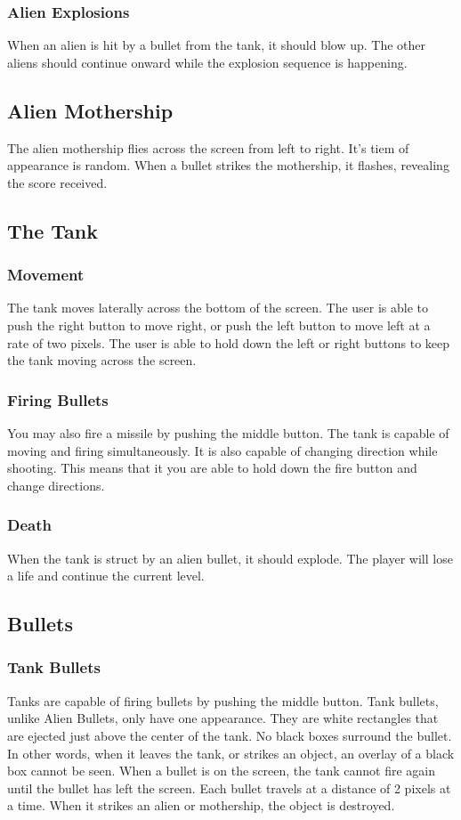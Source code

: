 \documentclass[11pt,letter,oneside]{report}
\begin{document}
\subsubsection{Alien Explosions}
When an alien is hit by a bullet from the tank, it should blow up.  The other aliens should continue onward while the explosion sequence is happening.

\subsection{Alien Mothership}
The alien mothership flies across the screen from left to right. It's tiem of appearance is random. When a bullet strikes the mothership, it flashes, revealing the score received.

\subsection{The Tank}
\subsubsection{Movement}
The tank moves laterally across the bottom of the screen. The user is able to push the right button to move right, or push the left button to move left at a rate of two pixels. The user is able to hold down the left or right buttons to keep the tank moving across the screen.
\subsubsection{Firing Bullets}
You may also fire a missile by pushing the middle button. The tank is capable of moving and firing simultaneously. It is also capable of changing direction while shooting. This means that it you are able to hold down the fire button and change directions.
\subsubsection{Death}
When the tank is struct by an alien bullet, it should explode.  The player will lose a life and continue the current level.

\subsection{Bullets}
\subsubsection{Tank Bullets}
Tanks are capable of firing bullets by pushing the middle button. Tank bullets, unlike Alien Bullets, only have one appearance. They are white rectangles that are ejected just above the center of the tank. No black boxes surround the bullet. In other words, when it leaves the tank, or strikes an object, an overlay of a black box cannot be seen. When a bullet is on the screen, the tank cannot fire again until the bullet has left the screen. Each bullet travels at a distance of 2 pixels at a time. When it strikes an alien or mothership, the object is destroyed.
\end{document}
